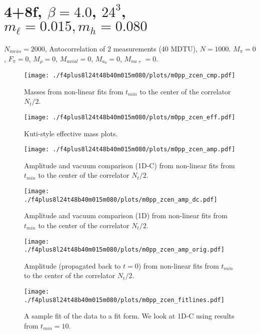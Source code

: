 
\section{4+8f, $\beta = 4.0$, $24^3$, $m_\ell = 0.015, m_h = 0.080$}

$N_{meas} = 2000$, Autocorrelation of 2 measurements (40 MDTU), $N = 1000$. $M_\pi = 0$, $F_\pi = 0$, $M_\rho = 0$, $M_{axial} = 0$, $M_{a_0} = 0$, $M_{nu+} = 0$. 



\begin{multicols}{2}
	\begin{figure}[H]
\centering
        \texttt{[image: ./f4plus8l24t48b40m015m080/plots/m0pp\_zcen\_cmp.pdf]}\\
	\caption{Masses from non-linear fits from $t_{min}$ to the center of the correlator $N_t/2$.}
\end{figure}
\columnbreak
\begin{figure}[H]
\centering
    \texttt{[image: ./f4plus8l24t48b40m015m080/plots/m0pp\_zcen\_eff.pdf]}\\
	\caption{Kuti-style effective mass plots. }
\end{figure}
\end{multicols}

\begin{multicols}{2}
	\begin{figure}[H]
\centering
        \texttt{[image: ./f4plus8l24t48b40m015m080/plots/m0pp\_zcen\_amp.pdf]}\\
	\caption{Amplitude and vacuum comparison (1D-C) from non-linear fits from $t_{min}$ to the center of the correlator $N_t/2$.}
\end{figure}
\columnbreak
\begin{figure}[H]
\centering
    \texttt{[image: ./f4plus8l24t48b40m015m080/plots/m0pp\_zcen\_amp\_dc.pdf]}\\
	\caption{Amplitude and vacuum comparison (1D) from non-linear fits from $t_{min}$ to the center of the correlator $N_t/2$.}
\end{figure}
\end{multicols}

\begin{multicols}{2}
	\begin{figure}[H]
\centering
        \texttt{[image: ./f4plus8l24t48b40m015m080/plots/m0pp\_zcen\_amp\_orig.pdf]}\\
	\caption{Amplitude (propagated back to $t=0$) from non-linear fits from $t_{min}$ to the center of the correlator $N_t/2$.}
\end{figure}
\columnbreak
\begin{figure}[H]
\centering
        \texttt{[image: ./f4plus8l24t48b40m015m080/plots/m0pp\_zcen\_fitlines.pdf]}\\
        \caption{A sample fit of the data to a fit form. We look at 1D-C using results from $t_{min} = 10$.}
\end{figure}

\end{multicols}

